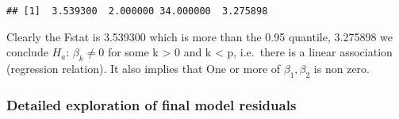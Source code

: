 \documentclass[
  12pt,
]{article}
\newenvironment{Shaded}{\begin{snugshade}}{\end{snugshade}}
\newcommand{\AttributeTok}[1]{\textcolor[rgb]{0.77,0.63,0.00}{#1}}
\newcommand{\DecValTok}[1]{\textcolor[rgb]{0.00,0.00,0.81}{#1}}
\newcommand{\FunctionTok}[1]{\textcolor[rgb]{0.00,0.00,0.00}{#1}}
\newcommand{\NormalTok}[1]{#1}
\newcommand{\OtherTok}[1]{\textcolor[rgb]{0.56,0.35,0.01}{#1}}
\newcommand{\SpecialCharTok}[1]{\textcolor[rgb]{0.00,0.00,0.00}{#1}}
\newcommand{\StringTok}[1]{\textcolor[rgb]{0.31,0.60,0.02}{#1}}
\begin{document}
\begin{verbatim}
## [1]  3.539300  2.000000 34.000000  3.275898
\end{verbatim}

Clearly the Fstat is 3.539300 which is more than the 0.95 quantile,
3.275898 we conclude \(H_{a}\): \(\beta_{k} \ne 0\) for some k
\textgreater{} 0 and k \textless{} p, i.e.~there is a linear association
(regression relation). It also implies that One or more of
\(\beta_{1}, \beta_{2}\) is non zero.

\hypertarget{detailed-exploration-of-final-model-residuals}{%
\subsubsection{Detailed exploration of final model
residuals}\label{detailed-exploration-of-final-model-residuals}}

\begin{Shaded}
\end{Shaded}
\end{document}
